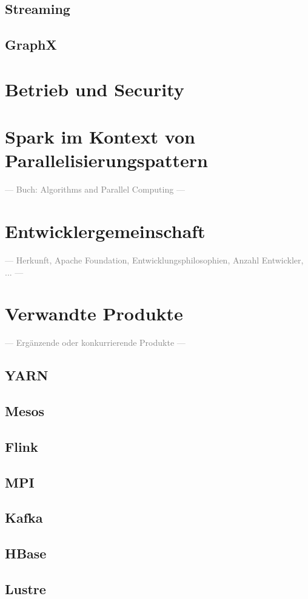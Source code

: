 \subsection{Streaming}
\subsection{GraphX}

\section{Betrieb und Security}

\section{Spark im Kontext von Parallelisierungspattern}
\textcolor{gray}{--- Buch: Algorithms and Parallel Computing ---}\\

\section{Entwicklergemeinschaft}
\textcolor{gray}{--- Herkunft, Apache Foundation, Entwicklungsphilosophien, Anzahl Entwickler, ... ---}\\

\section{Verwandte Produkte}
\textcolor{gray}{--- Ergänzende oder konkurrierende Produkte ---}\\
\subsection{YARN}
\subsection{Mesos}
\subsection{Flink}
\subsection{MPI}
\subsection{Kafka}
\subsection{HBase}
\subsection{Lustre}
